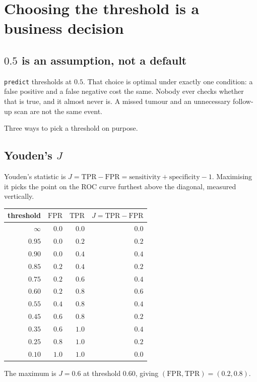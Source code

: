 \documentclass[11pt]{article}
\newcommand{\TPR}{\mathrm{TPR}}
\newcommand{\FPR}{\mathrm{FPR}}
\begin{document}
\section{Choosing the threshold is a business decision}
\label{sec:threshold}

\subsection{$0.5$ is an assumption, not a default}

\texttt{predict} thresholds at $0.5$. That choice is optimal under exactly one
condition: a false positive and a false negative cost the same. Nobody ever
checks whether that is true, and it almost never is. A missed tumour and an
unnecessary follow-up scan are not the same event.

Three ways to pick a threshold on purpose.

\subsection{Youden's $J$}

Youden's statistic is $J = \TPR - \FPR = \text{sensitivity} + \text{specificity}
- 1$. Maximising it picks the point on the ROC curve furthest above the diagonal,
measured vertically.

\begin{worked}
\begin{center}\small
\begin{tabular}{@{}rrrr@{}}
\toprule
threshold & $\FPR$ & $\TPR$ & $J = \TPR - \FPR$\\
\midrule
$\infty$ & $0.0$ & $0.0$ & $0.0$\\
$0.95$ & $0.0$ & $0.2$ & $0.2$\\
$0.90$ & $0.0$ & $0.4$ & $0.4$\\
$0.85$ & $0.2$ & $0.4$ & $0.2$\\
$0.75$ & $0.2$ & $0.6$ & $0.4$\\
$\mathbf{0.60}$ & $\mathbf{0.2}$ & $\mathbf{0.8}$ & $\mathbf{0.6}$\\
$0.55$ & $0.4$ & $0.8$ & $0.4$\\
$0.45$ & $0.6$ & $0.8$ & $0.2$\\
$0.35$ & $0.6$ & $1.0$ & $0.4$\\
$0.25$ & $0.8$ & $1.0$ & $0.2$\\
$0.10$ & $1.0$ & $1.0$ & $0.0$\\
\bottomrule
\end{tabular}
\end{center}
The maximum is $J = 0.6$ at threshold $0.60$, giving $(\FPR, \TPR) = (0.2, 0.8)$.
\end{worked}
\end{document}
